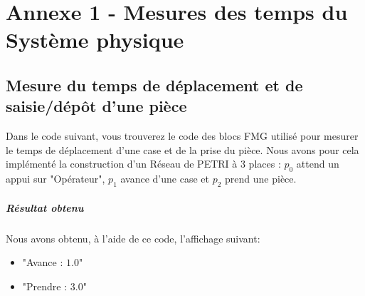 \chapter*{Annexe 1 - Mesures des temps du Système physique}
\setcounter{section}{0}
\label{Annex:MesuresXY}

\section{Mesure du temps de déplacement et de saisie/dépôt d'une pièce}
Dans le code suivant, vous trouverez le code des blocs FMG utilisé pour mesurer le temps de déplacement d'une case et de la prise du pièce. Nous avons pour cela implémenté la construction d'un Réseau de PETRI à 3 places : $p_0$ attend un appui sur "Opérateur", $p_1$ avance d'une case et $p_2$ prend une pièce. 

\paragraph*{Résultat obtenu}Nous avons obtenu, à l'aide de ce code, l'affichage suivant:
\begin{itemize}
\item [\textbullet] "Avance  : $1.0$"
\item [\textbullet] "Prendre : $3.0$"
\end{itemize}

